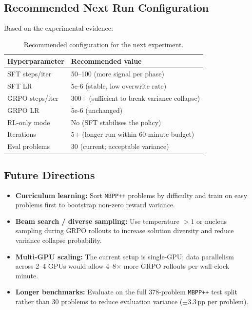 \documentclass[11pt,a4paper]{article}
\newcommand{\dataset}{\texttt{MBPP++}}
\begin{document}
\subsection{Recommended Next Run Configuration}

Based on the experimental evidence:

\begin{table}[H]
\centering
\caption{Recommended configuration for the next experiment.}
\begin{tabular}{@{}ll@{}}
\toprule
\textbf{Hyperparameter} & \textbf{Recommended value} \\
\midrule
SFT steps/iter  & 50--100 (more signal per phase) \\
SFT LR          & 5e-6 (stable, low overwrite rate) \\
GRPO steps/iter & 300+ (sufficient to break variance collapse) \\
GRPO LR         & 5e-6 (unchanged) \\
RL-only mode    & No (SFT stabilises the policy) \\
Iterations      & 5+ (longer run within 60-minute budget) \\
Eval problems   & 30 (current; acceptable variance) \\
\bottomrule
\end{tabular}
\end{table}

\subsection{Future Directions}

\begin{itemize}
  \item \textbf{Curriculum learning:} Sort \dataset{} problems by difficulty
    and train on easy problems first to bootstrap non-zero reward variance.
  \item \textbf{Beam search / diverse sampling:} Use temperature $>1$ or
    nucleus sampling during GRPO rollouts to increase solution diversity and
    reduce variance collapse probability.
  \item \textbf{Multi-GPU scaling:} The current setup is single-GPU; data
    parallelism across 2--4 GPUs would allow 4--8$\times$ more GRPO rollouts
    per wall-clock minute.
  \item \textbf{Longer benchmarks:} Evaluate on the full 378-problem
    \dataset{} test split rather than 30 problems to reduce evaluation variance
    ($\pm$3.3\,pp per problem).
\end{itemize}
\end{document}
